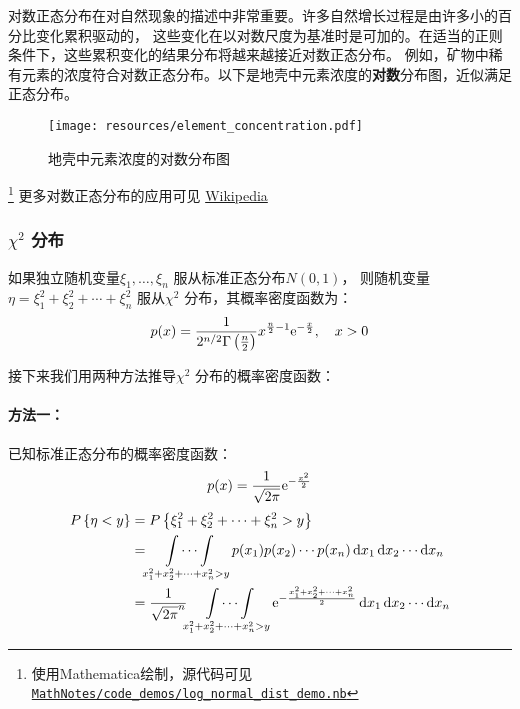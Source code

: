 对数正态分布在对自然现象的描述中非常重要。许多自然增长过程是由许多小的百分比变化累积驱动的，
这些变化在以对数尺度为基准时是可加的。在适当的正则条件下，这些累积变化的结果分布将越来越接近对数正态分布。
例如，矿物中稀有元素的浓度符合对数正态分布。以下是地壳中元素浓度的\textbf{对数}分布图，近似满足正态分布。
\begin{figure}[H]
    \centering
    \texttt{[image: resources/element\_concentration.pdf]}
    \caption{地壳中元素浓度的对数分布图}
    \label{fig:lognormal}
\end{figure}\footnote{使用Mathematica绘制，源代码可见
\href{https://github.com/Sazzzzzz/MathNotes/blob/main/code_demos/log_normal_dist_demo.nb}{\texttt{MathNotes/code_demos/log_normal_dist_demo.nb}}}
更多对数正态分布的应用可见
\href{https://en.wikipedia.org/wiki/Log-normal_distribution#Occurrence_and_applications}{Wikipedia}

\subsubsection{\(\chi^{2}\) 分布}
如果独立随机变量\(\xi_{1}, \dots ,\xi_{n}\) 服从标准正态分布\(N(0,1)\)，
则随机变量\(\eta = \xi_{1}^{2} + \xi_{2}^{2} + \cdots +
\xi_{n}^{2}\) 服从\(\chi^{2}\) 分布，其概率密度函数为：
\[
    p(x) = \frac{1}{2^{n/2} \Gamma\left(\frac{n}{2}\right)} x^{\frac{n}{2}-1}
    \mathrm{e}^{-\frac{x}{2}}, \quad x>0
\]

接下来我们用两种方法推导\(\chi^{2}\) 分布的概率密度函数：
\paragraph{方法一：}
已知标准正态分布的概率密度函数：\[
    p(x) = \frac{1}{\sqrt{2\pi}} \mathrm{e}^{-\frac{x^{2}}{2}}
\]
\begin{align*}
    \P{\eta<y} &= \P{\xi_{1}^{2} + \xi_{2}^{2} + \cdots +
    \xi_{n}^{2} > y} \\
    &= \idotsint\limits_{x_{1}^{2} + x_{2}^{2} + \cdots +
    x_{n}^{2} > y} p(x_{1}) p(x_{2}) \cdots p(x_{n}) \d{x}_{1}
    \d{x}_{2} \cdots \d{x}_{n} \\
    &= \frac{1}{\sqrt{2\pi}^{n}}
    \idotsint\limits_{x_{1}^{2} + x_{2}^{2} + \cdots + x_{n}^{2} > y}
    \e^{-\frac{x_{1}^{2}+ x_{2}^{2} +\dots + x_{n}^{2}}{2}}
    \d{x}_{1} \d{x}_{2} \cdots \d{x}_{n} \\
\end{align*}

